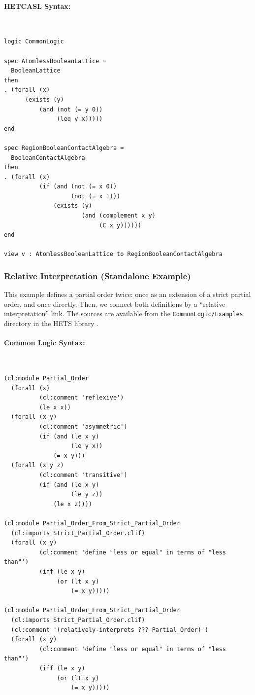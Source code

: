 \documentclass{article}
\newcommand{\normalTEXTSC}[2]{{#1\scriptsize#2}}
\newcommand     {\Hets}{\normalTEXTSC{H}{ETS}\xspace}
\newcommand{\HetCASL}{\normalTEXTSC{H}{ET}\normalTEXTSC{C}{ASL}\xspace}
\begin{document}
\paragraph{\HetCASL Syntax:}~\\
\begin{lstlisting}[language=hetcasl,morekeywords={forall,exists,and,not,if}]
logic CommonLogic

spec AtomlessBooleanLattice =
  BooleanLattice
then
. (forall (x)
	  (exists (y)
		  (and (not (= y 0))
		       (leq y x)))))
end

spec RegionBooleanContactAlgebra =
  BooleanContactAlgebra
then
. (forall (x)     
          (if (and (not (= x 0)) 
                   (not (= x 1))) 
              (exists (y)
                      (and (complement x y)
                           (C x y))))))
end

view v : AtomlessBooleanLattice to RegionBooleanContactAlgebra
\end{lstlisting}

\subsubsection{Relative Interpretation (Standalone Example)}\label{sec:rel-intpr-standalone}

This example defines a partial order twice: once as an extension of a strict partial order, and once directly.  Then, we connect both definitions by a ``relative interpretation'' link.  The sources are available from the \texttt{CommonLogic/Examples} directory in the \Hets library \cite{hets-library:URL}.

\paragraph{Common Logic Syntax:}~\\
\begin{lstlisting}[language=clif]
(cl:module Partial_Order
  (forall (x)
          (cl:comment 'reflexive')
          (le x x))
  (forall (x y)
          (cl:comment 'asymmetric')
          (if (and (le x y)
                   (le y x))
              (= x y)))
  (forall (x y z)
          (cl:comment 'transitive')
          (if (and (le x y)
                   (le y z))
              (le x z))))

(cl:module Partial_Order_From_Strict_Partial_Order
  (cl:imports Strict_Partial_Order.clif)
  (forall (x y)
          (cl:comment 'define "less or equal" in terms of "less than"')
          (iff (le x y)
               (or (lt x y)
                   (= x y)))))

(cl:module Partial_Order_From_Strict_Partial_Order
  (cl:imports Strict_Partial_Order.clif)
  (cl:comment '(relatively-interprets ??? Partial_Order)')
  (forall (x y)
          (cl:comment 'define "less or equal" in terms of "less than"')
          (iff (le x y)
               (or (lt x y)
                   (= x y)))))
\end{lstlisting}
\end{document}
